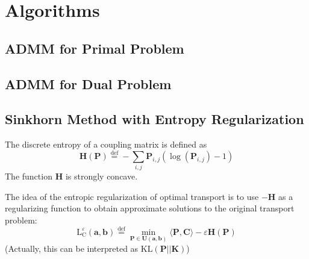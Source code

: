 \documentclass{article}
\begin{document}
\section{Algorithms}
\subsection{ADMM for Primal Problem}
\subsection{ADMM for Dual Problem}
\subsection{Sinkhorn Method with Entropy Regularization}
The discrete entropy of a coupling matrix is defined as
\begin{equation}
\mathbf { H } ( \mathbf { P } ) \stackrel { \mathrm { def } } { = } - \sum _ { i , j } \mathbf { P } _ { i , j } \left( \log \left( \mathbf { P } _ { i , j } \right) - 1 \right)
\end{equation}
The function $\mathbf{H}$ is strongly concave.

The idea of the entropic regularization of optimal transport is to use $-\mathbf{H}$ as a regularizing function to obtain approximate solutions to the original transport problem:
\begin{equation}
\mathrm { L } _ { \mathrm { C } } ^ { \varepsilon } ( \mathbf { a } , \mathbf { b } ) \stackrel { \mathrm { def } } { = } \min _ { \mathbf { P } \in \mathbf { U } ( \mathbf { a } , \mathbf { b } ) } \langle \mathbf { P } , \mathbf { C } \rangle - \varepsilon \mathbf { H } ( \mathbf { P } )
\label{sinkhorn target}
\end{equation}
(Actually, this can be interpreted as $\text{KL}(\mathbf{P}||\mathbf{K})$)
\end{document}
